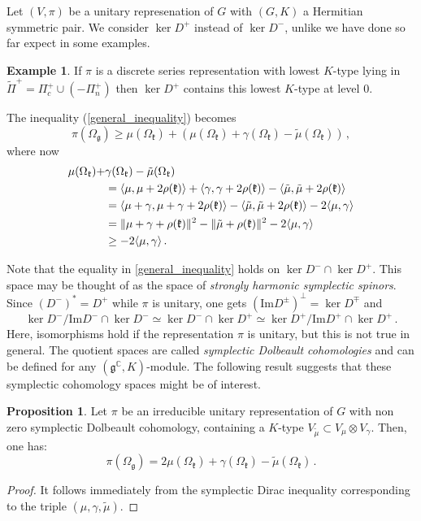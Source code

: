 \documentclass{amsart}[draft,11pt]
\newcommand{\mg}{\mathfrak{g}}
\newcommand{\mk}{\mathfrak{k}}
\newcommand{\fg}{{\mathfrak{g}}}
\newcommand{\fk}{{\mathfrak{k}}}
\numberwithin{equation}{section}
\theoremstyle{definition}
\newtheorem{proposition}[theorem]{Proposition}
\newtheorem{example}[theorem]{Example}
\begin{document}
Let $(V,\pi)$ be a unitary represenation of $G$
with $(G,K)$ a Hermitian symmetric pair.
We consider $\ker D^+$ instead of $\ker D^-$,
unlike we have done so far expect in some examples.
\begin{example}
If $\pi$ is a discrete series representation
with lowest $K$-type lying in 
$\widetilde{\Pi}^+=\Pi^+_c \cup (-\Pi^+_n)$ then
$\ker D^+$ contains this lowest $K$-type at level $0$.
\end{example}

The inequality (\ref{general_inequality})
becomes
$$
\pi(\Omega_\mg) \geq
\mu(\Omega_\mk)+
(\mu(\Omega_\mk)+\gamma(\Omega_\mk)-\tilde{\mu}(\Omega_\mk))\,,
$$
where now
\begin{align}
\mu(\Omega_\fk) + &\gamma(\Omega_\fk) -\tilde{\mu}(\Omega_\fk) \notag \\
& = \langle \mu, \mu+2\rho(\mk) \rangle +
\langle \gamma, \gamma +2\rho(\fk) \rangle
- \langle \tilde{\mu},\tilde{\mu} + 2\rho(\fk)
\rangle
\notag
 \\
& =  \langle \mu+\gamma, \mu+\gamma+2\rho(\mk) \rangle - 
\langle \tilde{\mu},\tilde{\mu}
+2\rho(\fk) \rangle
-2\langle \mu,\gamma\rangle
\notag
\\
&
=\|\mu+\gamma+\rho(\fk)\|^2-\|\tilde{\mu}+\rho(\fk)\|^2 -2\langle \mu,\gamma \rangle \notag\\
& \geq -2\langle \mu,\gamma \rangle \,.
\label{quite-good2}
\end{align}

Note that the equality in \eqref{general_inequality} holds on $\ker D^- \cap \ker D^+$. This space may be thought of as the space of \emph{strongly harmonic symplectic spinors}. 
Since $(D^-)^*=D^+$ while $\pi$ is unitary, 
one gets $(\mathrm{Im} D^\pm)^\perp = \ker D^\mp$ and 
$$
\ker D^-/\mathrm{Im} D^-\cap \ker D^-\simeq 
\ker D^- \cap \ker D^+ \simeq 
\ker D^+/\mathrm{Im} D^+\cap \ker D^+\,.
$$
Here, isomorphisms hold if  the representation $\pi$ 
is unitary, but this is not true in general. The quotient spaces are called \emph{symplectic Dolbeault cohomologies}
and can be defined for any $(\mathfrak{g}^\mathbb{C},K)$-module.
The following result suggests that these symplectic cohomology spaces might be of interest.
\begin{proposition}
Let $\pi$ be an irreducible unitary representation of $G$ with non zero symplectic Dolbeault cohomology, containing a $K$-type $V_{\tilde{\mu}}\subset V_\mu\otimes V_\gamma$.   
Then, one has:
$$ 
\pi(\Omega_\fg) = 2\mu(\Omega_\fk)+\gamma(\Omega_\fk) 
-\tilde{\mu}(\Omega_\fk)\,.
$$
\end{proposition}
\begin{proof}
It follows immediately from the symplectic Dirac inequality corresponding to the triple $(\mu,\gamma,\tilde{\mu})$.
\end{proof}
\end{document}

